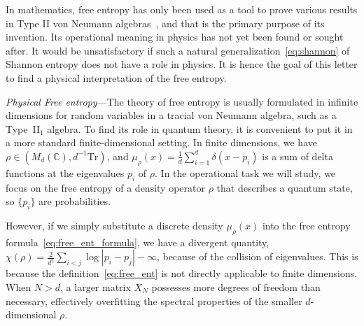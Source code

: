 \documentclass[aps,pre,twocolumn,superscriptaddress,amsmath,amssymb,reprint]{revtex4-2}
\newcommand*{\Tr}{\mathrm{Tr}}
\begin{document}
In mathematics, free entropy has only been used as a tool to prove various results in Type II von Neumann algebras~\cite{voiculescu1996analogues,ge1997applications,ge1998applications}, and that is the primary purpose of its invention. Its operational meaning in physics has not yet been found or sought after. It would be unsatisfactory if such a natural generalization~\eqref{eq:shannon} of Shannon entropy does not have a role in physics. It is hence the goal of this letter to find a physical interpretation of the free entropy.

\emph{Physical Free entropy}---The theory of free entropy is usually formulated in infinite dimensions for random variables in a tracial von Neumann algebra, such as a Type~II$_1$ algebra. To find its role in quantum theory, it is convenient to put it in a more standard finite-dimensional setting. In finite dimensions, we have $\rho\in (M_d(\mathbb{C}),d^{-1}\Tr)$, and $\mu_\rho(x) = \frac1d\sum_{i=1}^d\delta(x-p_i)$ is a sum of delta functions at the eigenvalues $p_i$ of $\rho$. In the operational task we will study, we focus on the free entropy of a density operator $\rho$ that describes a quantum state, so $\{p_i\}$ are probabilities. 

However, if we simply substitute a discrete density $\mu_\rho(x)$ into the free entropy formula~\eqref{eq:free_ent_formula}, we have a divergent quantity, $\chi(\rho) = \frac{2}{d^2}\sum_{i< j} \log|p_i-p_j|-\infty$, because of the collision of eigenvalues. This is because the definition~\eqref{eq:free_ent} is not directly applicable to finite dimensions. When $N>d$, a larger matrix $X_N$ possesses more degrees of freedom than necessary, effectively overfitting the spectral properties of the smaller $d$-dimensional $\rho$.
\end{document}
